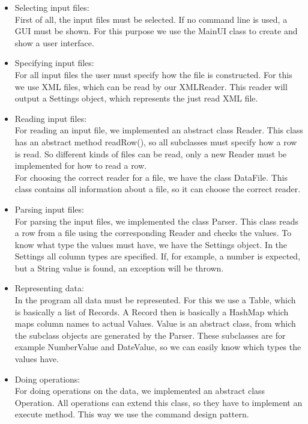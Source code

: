 \documentclass[11pt,twoside,a4paper]{article}
\begin{document}
\begin{itemize}

\item Selecting input files:\\
First of all, the input files must be selected. If no command line is used, a GUI must be shown. For this purpose we use the MainUI class to create and show a user interface.

\item Specifying input files:\\
For all input files the user must specify how the file is constructed. For this we use XML files, which can be read by our XMLReader. This reader will output a Settings object, which represents the just read XML file.

\item Reading input files:\\
For reading an input file, we implemented an abstract class Reader. This class has an abstract method readRow(), so all subclasses must specify how a row is read. So different kinds of files can be read, only a new Reader must be implemented for how to read a row.\\ 
For choosing the correct reader for a file, we have the class DataFile. This class contains all information about a file, so it can choose the correct reader.

\item Parsing input files:\\
For parsing the input files, we implemented the class Parser. This class reads a row from a file using the corresponding Reader and checks the values. To know what type the values must have, we have the Settings object. In the Settings all column types are specified. If, for example, a number is expected, but a String value is found, an exception will be thrown.

\item Representing data:\\
In the program all data must be represented. For this we use a Table, which is basically a list of Records. A Record then is basically a HashMap which maps column names to actual Values. Value is an abstract class, from which the subclass objects are generated by the Parser. These subclasses are for example NumberValue and DateValue, so we can easily know which types the values have.

\item Doing operations:\\
For doing operations on the data, we implemented an abstract class Operation. All operations can extend this class, so they have to implement an execute method. This way we use the command design pattern.


\end{itemize}
\end{document}

